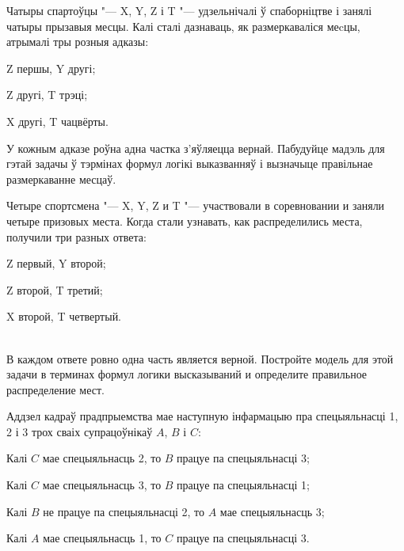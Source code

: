 \begin{problemList}
\bigskip

\problemItemSimple
{Чатыры спартоўцы "--- X, Y, Z і T "--- удзельнічалі ў спаборніцтве і занялі чатыры прызавыя месцы. Калі сталі дазнаваць, як размеркаваліся меcцы, атрымалі тры розныя адказы:
\begin{belarusianEnumerate}
	\item Z першы, Y другі;
	\item Z другі, T трэці;
	\item X другі, T чацвёрты.
\end{belarusianEnumerate}

У кожным адказе роўна адна частка з'яўляецца вернай. Пабудуйце мадэль для гэтай задачы ў тэрмінах формул логікі выказванняў і вызначыце правільнае размеркаванне месцаў.}
{Четыре спортсмена "--- X, Y, Z и T "--- участвовали в соревновании и заняли четыре призовых места. Когда стали узнавать, как распределились места, получили три разных ответа:
\begin{russianEnumerate}
	\item Z первый, Y второй;
	\item Z второй, T третий;
	\item X второй, T четвертый.
\end{russianEnumerate}\\
В каждом ответе ровно одна часть является верной. Постройте модель для этой задачи в терминах формул логики высказываний и определите правильное распределение мест.}

\bigskip

\problemItemSimple
{Аддзел кадраў прадпрыемства мае наступную інфармацыю пра спецыяльнасці 1, 2 і 3 трох сваіх супрацоўнікаў $A$, $B$ і $C$:
\begin{belarusianEnumerate}
	\item Калі $C$ мае спецыяльнасць 2, то $B$ працуе па спецыяльнасці 3;
	\item Калі $C$ мае спецыяльнасць 3, то $B$ працуе па спецыяльнасці 1;
	\item Калі $B$ не працуе па спецыяльнасці 2, то $A$ мае спецыяльнасць 3;
	\item Калі $A$ мае спецыяльнасць 1, то $C$ працуе па спецыяльнасці 3.
\end{belarusianEnumerate}

}
\end{problemList}
